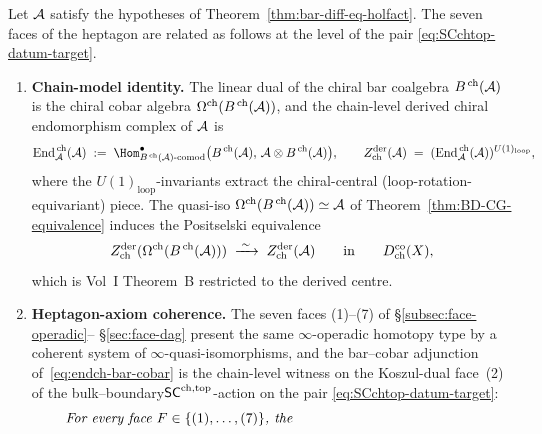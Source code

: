 \begin{proposition}
\label{prop:bar-koszul-chain-model-derived-centre}%
%
%
Let $\mathcal{A}$ satisfy the hypotheses of
Theorem~\ref{thm:bar-diff-eq-holfact}. The seven faces of the
heptagon are related as follows at the level of the pair
\eqref{eq:SCchtop-datum-target}.
\begin{enumerate}[label=\textup{(\alph*)}]
\item \textbf{Chain-model identity.} The linear dual of the chiral
bar coalgebra $B^{\,\mathrm{ch}}(\mathcal{A})$ is the chiral cobar
algebra $\Omega^{\mathrm{ch}}(B^{\,\mathrm{ch}}(\mathcal{A}))$, and the
chain-level derived chiral endomorphism complex of $\mathcal{A}$ is
\begin{equation}\label{eq:endch-bar-cobar}
 \End^{\,\mathrm{ch}}_{\cA}(\cA)
 \;:=\;
 \Hom^{\bullet}_{B^{\,\mathrm{ch}}(\cA)\text{-comod}}
 \bigl(B^{\,\mathrm{ch}}(\cA),\,\cA\otimes B^{\,\mathrm{ch}}(\cA)\bigr),
 \qquad
 Z^{\mathrm{der}}_{\mathrm{ch}}(\cA)
 \;=\;
 (\End^{\,\mathrm{ch}}_{\cA}(\cA))^{U(1)_{\mathrm{loop}}},
\end{equation}
where the $U(1)_{\mathrm{loop}}$-invariants extract the
chiral-central (loop-rotation-equivariant) piece. The quasi-iso
$\Omega^{\mathrm{ch}}(B^{\,\mathrm{ch}}(\mathcal{A}))\simeq\mathcal{A}$ of
Theorem~\ref{thm:BD-CG-equivalence} induces the Positselski
equivalence
\begin{equation}\label{eq:positselski-on-derived-centre}
 Z^{\mathrm{der}}_{\mathrm{ch}}(\Omega^{\mathrm{ch}}(B^{\,\mathrm{ch}}(\mathcal{A})))
 \;\xrightarrow{\;\sim\;}\;
 Z^{\mathrm{der}}_{\mathrm{ch}}(\mathcal{A})
 \qquad\text{in}\qquad D^{\mathrm{co}}_{\mathrm{ch}}(X),
\end{equation}
which is Vol~I Theorem~B restricted to the derived centre.
\item \textbf{Heptagon-axiom coherence.} The seven faces
\textup{(1)--(7)} of \S\ref{subsec:face-operadic}--%
\S\ref{sec:face-dag} present the same
$\infty$-operadic homotopy type by a coherent system of
$\infty$-quasi-isomorphisms, and the bar--cobar adjunction
of~\eqref{eq:endch-bar-cobar} is the chain-level witness on
the Koszul-dual face~\textup{(2)} of the
bulk--boundary$\mathsf{SC}^{\mathrm{ch},\mathrm{top}}$-action on the pair
\eqref{eq:SCchtop-datum-target}:
\begin{equation}\label{eq:heptagon-axiom}
 \parbox{0.86\linewidth}{\emph{For every face
 $F\in\{\textup{(1)},\ldots,\textup{(7)}\}$, the
}}
\end{equation}
\end{enumerate}
\end{proposition}
